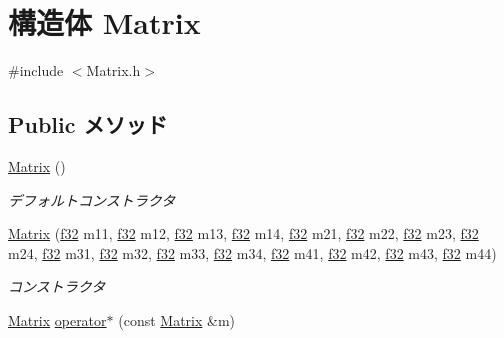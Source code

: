 \hypertarget{struct_matrix}{\section{構造体 Matrix}
\label{struct_matrix}
}


{\ttfamily \#include $<$Matrix.\-h$>$}

\subsection*{Public メソッド}
\begin{DoxyCompactItemize}
\item 
\hyperlink{struct_matrix_a2dba13c45127354c9f75ef576f49269b}{Matrix} ()
\begin{DoxyCompactList}\small\item\em デフォルトコンストラクタ \end{DoxyCompactList}\item 
\hyperlink{struct_matrix_a59d1a2a7e2e609966a8a3460f8ed1403}{Matrix} (\hyperlink{_main_8h_a5f6906312a689f27d70e9d086649d3fd}{f32} m11, \hyperlink{_main_8h_a5f6906312a689f27d70e9d086649d3fd}{f32} m12, \hyperlink{_main_8h_a5f6906312a689f27d70e9d086649d3fd}{f32} m13, \hyperlink{_main_8h_a5f6906312a689f27d70e9d086649d3fd}{f32} m14, \hyperlink{_main_8h_a5f6906312a689f27d70e9d086649d3fd}{f32} m21, \hyperlink{_main_8h_a5f6906312a689f27d70e9d086649d3fd}{f32} m22, \hyperlink{_main_8h_a5f6906312a689f27d70e9d086649d3fd}{f32} m23, \hyperlink{_main_8h_a5f6906312a689f27d70e9d086649d3fd}{f32} m24, \hyperlink{_main_8h_a5f6906312a689f27d70e9d086649d3fd}{f32} m31, \hyperlink{_main_8h_a5f6906312a689f27d70e9d086649d3fd}{f32} m32, \hyperlink{_main_8h_a5f6906312a689f27d70e9d086649d3fd}{f32} m33, \hyperlink{_main_8h_a5f6906312a689f27d70e9d086649d3fd}{f32} m34, \hyperlink{_main_8h_a5f6906312a689f27d70e9d086649d3fd}{f32} m41, \hyperlink{_main_8h_a5f6906312a689f27d70e9d086649d3fd}{f32} m42, \hyperlink{_main_8h_a5f6906312a689f27d70e9d086649d3fd}{f32} m43, \hyperlink{_main_8h_a5f6906312a689f27d70e9d086649d3fd}{f32} m44)
\begin{DoxyCompactList}\small\item\em コンストラクタ \end{DoxyCompactList}\item 
\hyperlink{struct_matrix}{Matrix} \hyperlink{struct_matrix_ae69a6d3345472ac03f440c564d05580a}{operator$\ast$} (const \hyperlink{struct_matrix}{Matrix} \&m)
\end{DoxyCompactItemize}
